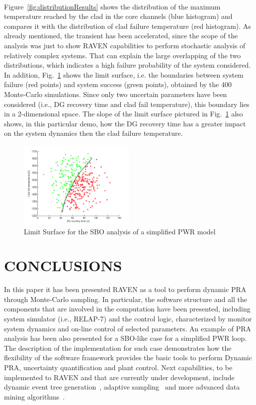 \documentclass{anstrans}
\begin{document}
\\Figure~\ref{fig:distributionResults} shows the distribution of the maximum temperature reached by the clad in the core channels (blue histogram) and compares it with the distribution of clad failure temperature (red histogram).
As already mentioned, the transient has been accelerated, since the scope of the analysis was just to show RAVEN capabilities to perform stochastic analysis of relatively complex systems. That can explain the large overlapping of the two distributions, which indicates a high failure probability of the system considered.                               
In addition, Fig.~\ref{fig:limit_surface_rng_temp_and_dg} shows the limit surface, i.e. the boundaries between system failure (red points) and system success (green points), obtained by the 400 Monte-Carlo simulations. Since only two uncertain parameters have been considered (i.e., DG recovery time and clad fail temperature), this boundary lies in a 2-dimensional space.
The slope of the limit surface pictured in Fig.~\ref{fig:limit_surface_rng_temp_and_dg} also shows, in this particular demo, how the DG recovery time has a greater impact on the system dynamics then the clad failure temperature.
\begin{figure}
   \centering
    \includegraphics[width=0.5\textwidth]{figures/PRA_limitSurface.png}
    \caption{Limit Surface for the SBO analysis of a simplified PWR model}
    \label{fig:limit_surface_rng_temp_and_dg}
\end{figure}
\section{CONCLUSIONS}
In this paper it has been presented RAVEN as a tool to perform dynamic PRA through Monte-Carlo sampling. In particular, the software structure and all the components that are involved in the computation have been presented, including system simulator (i.e., RELAP-7) and the control logic, characterized by monitor system dynamics and on-line control of selected parameters.
An example of PRA analysis has been also presented for a SBO-like case for a simplified PWR loop. 
The description of the implementation for such case demonstrates how the flexibility of the software framework provides the basic tools to perform Dynamic PRA, uncertainty quantification and plant control. 
Next capabilities, to be implemented to RAVEN and that are currently under development, include dynamic event tree generation~\cite{ADAPTHakobyan}, adaptive sampling~\cite{mandelliSVMANS} and more advanced data mining algorithms~\cite{mandelliEsrel2011}. 




\end{document}

